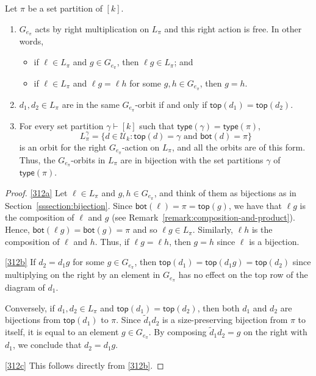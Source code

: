 \documentclass[ALCO,Unicode]{cedram}
\begin{document}
\begin{prop}\label{prop:orbitreps}
Let $\pi$ be a set partition of $[k]$.
\begin{enumerate}[label=(\alph*)]
    \item\label{312a}
        $G_{e_\pi}$ acts by right multiplication on $L_\pi$
        and this right action is free. In other words,
        \begin{itemize}
            \item
                if $\ell \in L_\pi$ and $g \in G_{e_\pi}$, then $\ell g \in L_\pi$; and
            \item
                if $\ell \in L_\pi$ and $\ell g = \ell h$ for some $g, h \in G_{e_\pi}$, then $g = h$.
        \end{itemize}

    \item \label{312b}
        $d_1, d_2\in L_\pi$ are in the same $G_{e_\pi}$-orbit if and only if $\mathsf{top}(d_1) = \mathsf{top}(d_2)$.

    \item \label{312c}
        For every set partition $\gamma\vdash [k]$ such that $\mathsf{type}(\gamma) = \mathsf{type}(\pi)$,
        $$L_{\pi}^\gamma = \{d \in \mathcal{U}_k : \mathsf{top}(d) = \gamma \text{ and } \mathsf{bot}(d) = \pi\}$$
        is an orbit for the right $G_{e_\pi}$-action on $L_\pi$, and all the orbits are of this form.
        Thus, the $G_{e_\pi}$-orbits in $L_\pi$ are in bijection with the set partitions $\gamma$ of $\mathsf{type}(\pi)$.
\end{enumerate}
\end{prop}

\begin{proof}
   \ref{312a} Let $\ell \in L_\pi$ and $g, h \in G_{e_\pi}$, and think of them as bijections
    as in Section~\ref{sssection:bijection}.
    Since $\mathsf{bot}(\ell) = \pi = \mathsf{top}(g)$,
    we have that $\ell g$ is the composition of $\ell$ and $g$ (see Remark~\ref{remark:composition-and-product}).
    Hence, $\mathsf{bot}(\ell g) = \mathsf{bot}(g) = \pi$ and so $\ell g \in L_\pi$.
    Similarly, $\ell h$ is the composition of $\ell$ and $h$. Thus,
    if $\ell g = \ell h$, then $g = h$ since $\ell$ is a bijection.

    \ref{312b} If $d_2 = d_1 g$ for some $g \in G_{e_\pi}$, then $\mathsf{top}(d_1)
    = \mathsf{top}(d_1 g) = \mathsf{top}(d_2)$ since multiplying on the right
    by an element in $G_{e_\pi}$ has no effect on the top row of the diagram of $d_1$.

    Conversely, if $d_1, d_2 \in L_\pi$ and $\mathsf{top}(d_1)
    = \mathsf{top}(d_2)$, then both $d_1$ and $d_2$ are
    bijections from $\mathsf{top}(d_1)$ to $\pi$.
    Since $\widetilde{d}_1 d_2$ is a size-preserving bijection
    from $\pi$ to itself, it is equal to an element $g \in G_{e_\pi}$.
    By composing $\widetilde{d}_1 d_2 = g$ on the right with $d_1$,
    we conclude that $d_2 = d_1 g$.

    \ref{312c} This follows directly from \ref{312b}.
\end{proof}
\end{document}
